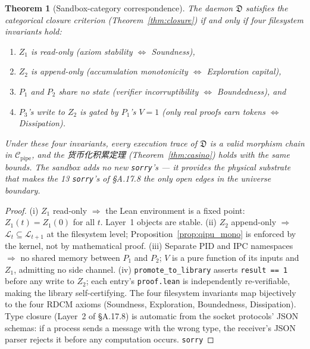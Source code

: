 \documentclass[11pt,a4paper]{article}
\newtheorem{theorem}{Theorem}[section]
\theoremstyle{definition}
\theoremstyle{remark}
\begin{document}
\begin{theorem}[Sandbox-category correspondence]\label{thm:sandbox}
The daemon $\mathfrak{D}$ satisfies the categorical closure criterion (Theorem~\ref{thm:closure}) if and only if four filesystem invariants hold:
\begin{enumerate}[nosep]
\item[(i)] $Z_1$ is read-only (axiom stability $\Leftrightarrow$ Soundness),
\item[(ii)] $Z_2$ is append-only (accumulation monotonicity $\Leftrightarrow$ Exploration capital),
\item[(iii)] $P_1$ and $P_2$ share no state (verifier incorruptibility $\Leftrightarrow$ Boundedness), and
\item[(iv)] $P_3$'s write to $Z_2$ is gated by $P_1$'s $V = 1$ (only real proofs earn tokens $\Leftrightarrow$ Dissipation).
\end{enumerate}
Under these four invariants, every execution trace of $\mathfrak{D}$ is a valid morphism chain in $\mathcal{C}_{\mathrm{pipe}}$, and the 货币化积累定理 (Theorem~\ref{thm:casino}) holds with the same bounds. The sandbox adds no new \texttt{sorry}'s --- it provides the physical substrate that makes the 13 \texttt{sorry}'s of \S A.17.8 the \emph{only} open edges in the universe boundary.
\end{theorem}

\begin{proof}
(i) $Z_1$ read-only $\Rightarrow$ the Lean environment is a fixed point: $Z_1(t) = Z_1(0)$ for all $t$. Layer~1 objects are stable. (ii) $Z_2$ append-only $\Rightarrow$ $\mathcal{L}_t \subseteq \mathcal{L}_{t+1}$ at the filesystem level; Proposition~\ref{prop:qipu_mono} is enforced by the kernel, not by mathematical proof. (iii) Separate PID and IPC namespaces $\Rightarrow$ no shared memory between $P_1$ and $P_2$; $V$ is a pure function of its inputs and $Z_1$, admitting no side channel. (iv) \texttt{promote\_to\_library} asserts \texttt{result == 1} before any write to $Z_2$; each entry's \texttt{proof.lean} is independently re-verifiable, making the library self-certifying. The four filesystem invariants map bijectively to the four RDCM axioms (Soundness, Exploration, Boundedness, Dissipation). Type closure (Layer~2 of \S A.17.8) is automatic from the socket protocols' JSON schemas: if a process sends a message with the wrong type, the receiver's JSON parser rejects it before any computation occurs. \texttt{sorry}
\end{proof}
\end{document}
